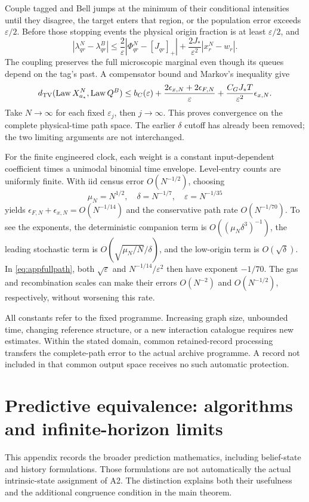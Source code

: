 Couple tagged and Bell jumps at the minimum of their conditional intensities until they disagree, the target enters that region, or the population error exceeds $\varepsilon/2$. Before those stopping events the physical origin fraction is at least $\varepsilon/2$, and
\[
|\lambda^N_{qr}-\lambda^B_{qr}|
\le\frac2\varepsilon|\Phi^N_{qr}-[J_{qr}]_+|
+\frac{2J_*}{\varepsilon^2}|x_r^N-w_r|.
\]
The coupling preserves the full microscopic marginal even though its queues depend on the tag's past. A compensator bound and Markov's inequality give
\begin{equation}\label{eq:appfullpath}
d_{\mathrm{TV}}(\operatorname{Law} X_{a_*}^N,\operatorname{Law} Q^B)
\le b_C(\varepsilon)+\frac{2\epsilon_{x,N}+2\epsilon_{F,N}}\varepsilon
 +\frac{C_GJ_*T}{\varepsilon^2}\epsilon_{x,N}.
\end{equation}
Take $N\to\infty$ for each fixed $\varepsilon_j$, then $j\to\infty$. This proves convergence on the complete physical-time path space. The earlier $\delta$ cutoff has already been removed; the two limiting arguments are not interchanged.

For the finite engineered clock, each weight is a constant input-dependent coefficient times a unimodal binomial time envelope. Level-entry counts are uniformly finite. With iid census error $O(N^{-1/2})$, choosing
\[
\mu_N=N^{1/2},\quad \delta=N^{-1/7},\quad
\varepsilon=N^{-1/35}
\]
yields $\epsilon_{F,N}+\epsilon_{x,N}=O(N^{-1/14})$ and the conservative path rate $O(N^{-1/70})$. To see the exponents, the deterministic companion term is $O((\mu_N\delta^3)^{-1})$, the leading stochastic term is $O(\sqrt{\mu_N/N}/\delta)$, and the low-origin term is $O(\sqrt\delta)$. In \cref{eq:appfullpath}, both $\sqrt\varepsilon$ and $N^{-1/14}/\varepsilon^2$ then have exponent $-1/70$. The gas and recombination scales can make their errors $O(N^{-2})$ and $O(N^{-1/2})$, respectively, without worsening this rate.

All constants refer to the fixed programme. Increasing graph size, unbounded time, changing reference structure, or a new interaction catalogue requires new estimates. Within the stated domain, common retained-record processing transfers the complete-path error to the actual archive programme. A record not included in that common output space receives no such automatic protection.

\chapter{Predictive equivalence: algorithms and infinite-horizon limits}\label{app:predictive}
This appendix records the broader prediction mathematics, including belief-state and history formulations. Those formulations are not automatically the actual intrinsic-state assignment of A2. The distinction explains both their usefulness and the additional congruence condition in the main theorem.
